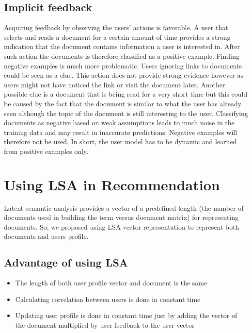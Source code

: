 \subsection{Implicit feedback}
Acquiring feedback by observing the users’ actions is favorable. A user that selects and reads a document for a certain amount of time provides a strong indication that the document contains information a user is interested in. After such action the documents is therefore classified as a positive example. Finding negative examples is much more problematic. Users ignoring links to documents could be seen as a clue. This action does not provide strong evidence however as users might not have noticed the link or visit the document later. Another possible clue is a document that is being read for a very short time but this could be caused by the fact that the document is similar to what the user has already seen although the topic of the document is still interesting to the user. Classifying documents as negative based on weak assumptions leads to much noise in the training data and may result in inaccurate predictions. Negative examples will therefore not be used. In short, the user model has to be dynamic and learned from positive examples only.
\section{Using LSA in Recommendation}\label{adv_lsa}
Latent semantic analysis provides a vector of a predefined length (the number of documents used in building the term versus document matrix) for representing documents.
So, we proposed using LSA vector representation to represent both documents and users profile.
\subsection{Advantage of using LSA}
\begin{itemize}
\item  The length of both user profile vector and document is the same
\item  Calculating correlation between users is done in constant time
\item  Updating user profile is done in constant time just by adding the vector of the document multiplied by user feedback to the user vector
\end{itemize}









